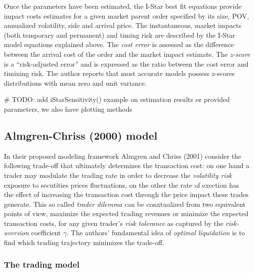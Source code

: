 Once the parameters have been estimated, the I-Star best fit equations
provide impact costs estimates for a given market parent order specified
by its size, POV, annualized volatility, side and arrival price. The
instantaneous, market impacts (both temporary and permanent) and timing
risk are described by the I-Star model equations explained above. The
\emph{cost error} is assessed as the difference between the arrival cost
of the order and the market impact estimate. The \emph{z-score} is a
``risk-adjusted error'' and is expressed as the ratio between the cost
error and timining risk. The author reports that most accurate models
possess z-scores distributions with mean zero and unit variance.

\begin{Schunk}
\begin{Sinput}
# TODO: add iStarSensitivity() example on estimation results or provided parameters, we also have plotting methods
\end{Sinput}
\end{Schunk}

\hypertarget{almgren-chriss-2000-model}{%
\subsection{Almgren-Chriss (2000)
model}\label{almgren-chriss-2000-model}}

In their proposed modeling framework Almgren and Chriss (2001) consider
the following trade-off that ultimately determines the transaction cost:
on one hand a trader may modulate the trading rate in order to decrease
the \emph{volatility risk} exposure to secutities prices fluctuations,
on the other the rate of exection has the effect of increasing the
transaction cost through the price impact these trades generate. This so
called \emph{trader dilemma} can be conxtualized from two equivalent
points of view, maximize the expected trading revenues or minimize the
expected transaction costs, for any given trader's \emph{risk tolerance}
as captured by the \emph{risk-aversion} coefficient \(\gamma\). The
authors' fundamental idea of \emph{optimal liquidation} is to find which
trading trajectory minimizes the trade-off.

\hypertarget{the-trading-model}{%
\subsubsection{The trading model}\label{the-trading-model}}

